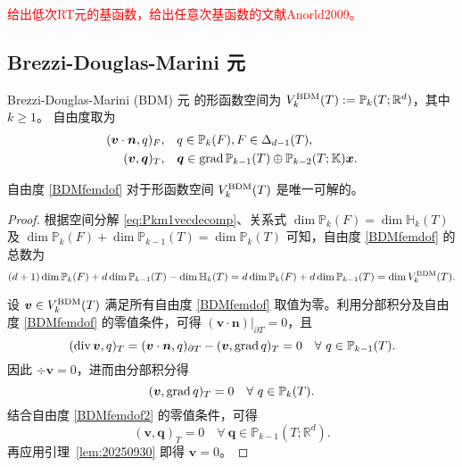 \textcolor{red}{给出低次RT元的基函数，给出任意次基函数的文献Anorld2009。}

\subsection{Brezzi-Douglas-Marini 元}

Brezzi-Douglas-Marini (BDM) 元 \cite{BrezziDouglasMarini1985,BrezziDouglasDuranFortin1987,Nedelec1986,ChenHuang2022,ChenChenHuangWei2024,ChenHuang2024} 的形函数空间为 $V_k^{\rm BDM}(T):= \mathbb P_{k}(T; \mathbb R^d)$，其中 $k\geq1$。
自由度取为
\begin{subequations}\label{BDMfemdof}
\begin{align}
(\boldsymbol v\cdot\boldsymbol  n, q)_F, & \quad q\in\mathbb P_{k}(F),  F\in\Delta_{d-1}(T),\label{BDMfemdof1}\\
(\boldsymbol v, \boldsymbol q)_T, & \quad \boldsymbol q\in\operatorname{grad} \mathbb P_{k-1}(T)\oplus\mathbb P_{k-2}(T;\mathbb K)\boldsymbol x. \label{BDMfemdof2}
\end{align}
\end{subequations}



\begin{lemma}\label{lem:unisovlenBDMfem}
自由度 \eqref{BDMfemdof} 对于形函数空间 $V_k^{\rm BDM}(T)$ 是唯一可解的。
\end{lemma}
\begin{proof}
根据空间分解 \eqref{eq:Pkm1vecdecomp}、关系式 $\dim\mathbb P_{k}(F)=\dim \mathbb H_{k}(T)$ 及 $\dim\mathbb P_{k}(F)+\dim\mathbb P_{k-1}(T)=\dim\mathbb P_{k}(T)$ 可知，自由度 \eqref{BDMfemdof} 的总数为
\begin{equation*}
(d+1)\dim\mathbb P_{k}(F)+d\dim\mathbb P_{k-1}(T) - \dim\mathbb H_{k}(T) = d\dim\mathbb P_{k}(F)+d\dim\mathbb P_{k-1}(T) = \dim V_k^{\rm BDM}(T).
\end{equation*}

设 $\boldsymbol{v}\in V_k^{\rm BDM}(T)$ 满足所有自由度 \eqref{BDMfemdof} 取值为零。利用分部积分及自由度 \eqref{BDMfemdof} 的零值条件，可得 $(\boldsymbol{v}\cdot\boldsymbol{n})|_{\partial T}=0$，且
\begin{equation*}
(\operatorname{div}\boldsymbol{v}, q)_T=(\boldsymbol{v}\cdot\boldsymbol{n},q)_{\partial T} - (\boldsymbol{v},\operatorname{grad} q)_T=0\quad\forall~q\in \mathbb P_{k-1}(T).
\end{equation*}
因此 $\div\boldsymbol{v}=0$，进而由分部积分得
\begin{equation*}
(\boldsymbol{v},\operatorname{grad} q)_T=0\quad\forall~q\in \mathbb P_{k}(T).
\end{equation*}
结合自由度 \eqref{BDMfemdof2} 的零值条件，可得
\begin{equation*}
(\boldsymbol v, \boldsymbol q)_T =0 \quad \forall~\boldsymbol q\in\mathbb P_{k-1}(T; \mathbb R^d).
\end{equation*}
再应用引理~\ref{lem:20250930} 即得 $\boldsymbol{v}=0$。
\end{proof}


